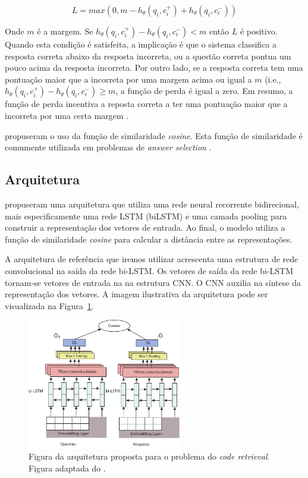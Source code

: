 \documentclass[12pt]{article}
\begin{document}
\begin{equation}
L = max(0, m - h_{\theta}(q_{i}, c_{i}^{+}) + h_{\theta}(q_{i}, c_{i}^{-}))   
\end{equation}


Onde $m$ é a margem. Se $h_{\theta}(q_{i}, c_{i}^{+}) - h_{\theta}(q_{i}, c_{i}^{-}) < m$ então $L$ é positivo. Quando esta condição é satisfeita, a implicação é que o sistema classifica a resposta correta abaixo da resposta incorreta, ou a questão correta pontua um pouco acima da resposta incorreta. Por outro lado, se a resposta correta tem uma pontuação maior que a incorreta por uma margem acima ou igual a $m$ (i.e., $h_{\theta}(q_{i}, c_{i}^{+}) - h_{\theta}(q_{i}, c_{i}^{-}) \geq m$, a função de perda é igual a zero. Em resumo, a função de perda incentiva a reposta correta a ter uma pontuação maior que a incorreta por uma certa margem \cite{lai-etal-2018-review}.

\cite{tan-lstm-qa} propuseram o uso da função de similaridade \textit{cosine}. Esta função de similaridade é comumente utilizada em problemas de \textit{answer selection} \cite{feng-answer-selection-2015}. 

\subsection{Arquitetura}

\cite{tan-lstm-qa} propuseram uma arquitetura que utiliza uma rede neural recorrente bidirecional, mais especificamente uma rede LSTM (biLSTM) \cite{hochreiter-Schmidhuber-lstm-1997} e uma camada pooling para construir a representação dos vetores de entrada. Ao final, o modelo utiliza a função de similaridade \textit{cosine} para calcular a distância
entre as representações. 

A arquitetura de referência que iremos utilizar acrescenta uma estrutura de rede convolucional na saída da rede bi-LSTM. Os vetores de saída da rede bi-LSTM tornam-se vetores de entrada na na estrutura CNN. O CNN auxilia na síntese da representação dos vetores. A imagem ilustrativa da arquitetura pode ser visualizada na Figura~\ref{fig:arquitetura-bi-lstm}.


\begin{figure}[h]
    \centering
    \includegraphics[width=0.6\textwidth]{figures/ArquiteturaBiLSTM.pdf}
    \caption{Figura da arquitetura proposta para o problema do \textit{code retrieval}. Figura adaptada do \cite{tan-lstm-qa}.}
    \label{fig:arquitetura-bi-lstm}
\end{figure}
\end{document}
